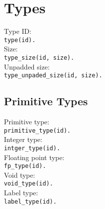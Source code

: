\section{Types} %
Type ID:\\
\tab \lstinline{type(id).}
\\
Size:\\
\tab \lstinline{type_size(id, size).}
\\
Unpadded size:\\
\tab \lstinline{type_unpaded_size(id, size).}

\subsection{Primitive Types} %
Primitive type:\\
\tab \lstinline{primitive_type(id).}
\\
Integer type:\\
\tab \lstinline{intger_type(id).}
\\
Floating point type:\\
\tab \lstinline{fp_type(id).}
\\
Void type:\\
\tab \lstinline{void_type(id).}
\\
Label type:\\
\tab \lstinline{label_type(id).}

